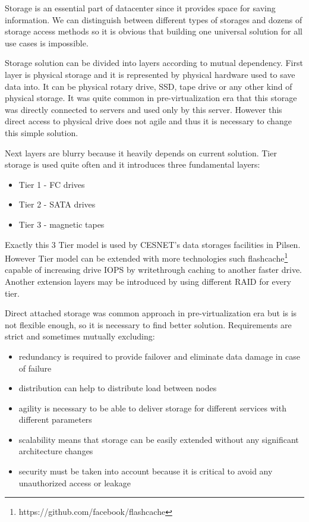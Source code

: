 

Storage is an essential part of datacenter since it provides space for saving information. We can distinguish between different types of storages and dozens of storage access methods so it is obvious that building one universal solution for all use cases is impossible. 

Storage solution can be divided into layers according to mutual dependency. First layer is physical storage and it is represented by physical hardware used to save data into. It can be physical rotary drive, \Ac{SSD}, tape drive or any other kind of physical storage. It was quite common in pre-virtualization era that this storage was directly connected to servers and used only by this server. However this direct access to physical drive does not agile and thus it is necessary to change this simple solution.

Next layers are blurry because it heavily depends on current solution. Tier storage is used quite often and it introduces three fundamental layers:
\begin{itemize}
	\item Tier 1 - \Ac{FC} drives
	\item Tier 2 - \Ac{SATA} drives
	\item Tier 3 - magnetic tapes
\end{itemize}
Exactly this 3 Tier model is used by CESNET's data storages facilities in Pilsen. However Tier model can be extended with more technologies such flashcache\footnote{https://github.com/facebook/flashcache} capable of increasing drive \Ac{IOPS} by writethrough caching to another faster drive. Another extension layers may be introduced by using different \Ac{RAID} for every tier.

Direct attached storage was common approach in pre-virtualization era but is is not flexible enough, so it is necessary to find better solution. Requirements are strict and sometimes mutually excluding:
\begin{itemize}
	\item redundancy is required to provide failover and eliminate data damage in case of failure 
	\item distribution can help to distribute load between nodes
	\item agility is necessary to be able to deliver storage for different services with different parameters
	\item scalability means that storage can be easily extended without any significant architecture changes
	\item security must be taken into account because it is critical to avoid any unauthorized access or leakage
\end{itemize}







